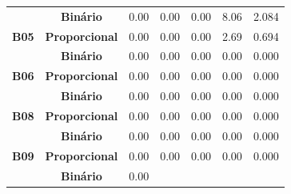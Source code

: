 \begin{table}[htbp]
\begin{tabular}{|c|cccccc|}
		&
		\multicolumn{1}{c|}{\textbf{Binário}} &
		\multicolumn{1}{c|}{0.00} &
		\multicolumn{1}{c|}{0.00} &
		\multicolumn{1}{c|}{0.00} &
		\multicolumn{1}{c|}{8.06} &
		2.084 \\ \cline{2-7} 
		\multirow{-2}{*}{\textbf{B05}} &
		\multicolumn{1}{l|}{\cellcolor[HTML]{F2F2F2}\textbf{Proporcional}} &
		\multicolumn{1}{c|}{\cellcolor[HTML]{F2F2F2}0.00} &
		\multicolumn{1}{c|}{\cellcolor[HTML]{F2F2F2}0.00} &
		\multicolumn{1}{c|}{\cellcolor[HTML]{F2F2F2}0.00} &
		\multicolumn{1}{c|}{\cellcolor[HTML]{F2F2F2}2.69} &
		\cellcolor[HTML]{F2F2F2}0.694 \\ \hline
		&
		\multicolumn{1}{c|}{\textbf{Binário}} &
		\multicolumn{1}{c|}{0.00} &
		\multicolumn{1}{c|}{0.00} &
		\multicolumn{1}{c|}{0.00} &
		\multicolumn{1}{c|}{0.00} &
		0.000 \\ \cline{2-7} 
		\multirow{-2}{*}{\textbf{B06}} &
		\multicolumn{1}{l|}{\cellcolor[HTML]{F2F2F2}\textbf{Proporcional}} &
		\multicolumn{1}{c|}{\cellcolor[HTML]{F2F2F2}0.00} &
		\multicolumn{1}{c|}{\cellcolor[HTML]{F2F2F2}0.00} &
		\multicolumn{1}{c|}{\cellcolor[HTML]{F2F2F2}0.00} &
		\multicolumn{1}{c|}{\cellcolor[HTML]{F2F2F2}0.00} &
		\cellcolor[HTML]{F2F2F2}0.000 \\ \hline
		&
		\multicolumn{1}{c|}{\textbf{Binário}} &
		\multicolumn{1}{c|}{0.00} &
		\multicolumn{1}{c|}{0.00} &
		\multicolumn{1}{c|}{0.00} &
		\multicolumn{1}{c|}{0.00} &
		0.000 \\ \cline{2-7} 
		\multirow{-2}{*}{\textbf{B08}} &
		\multicolumn{1}{l|}{\cellcolor[HTML]{F2F2F2}\textbf{Proporcional}} &
		\multicolumn{1}{c|}{\cellcolor[HTML]{F2F2F2}0.00} &
		\multicolumn{1}{c|}{\cellcolor[HTML]{F2F2F2}0.00} &
		\multicolumn{1}{c|}{\cellcolor[HTML]{F2F2F2}0.00} &
		\multicolumn{1}{c|}{\cellcolor[HTML]{F2F2F2}0.00} &
		\cellcolor[HTML]{F2F2F2}0.000 \\ \hline
		&
		\multicolumn{1}{c|}{\textbf{Binário}} &
		\multicolumn{1}{c|}{0.00} &
		\multicolumn{1}{c|}{0.00} &
		\multicolumn{1}{c|}{0.00} &
		\multicolumn{1}{c|}{0.00} &
		0.000 \\ \cline{2-7} 
		\multirow{-2}{*}{\textbf{B09}} &
		\multicolumn{1}{l|}{\cellcolor[HTML]{F2F2F2}\textbf{Proporcional}} &
		\multicolumn{1}{c|}{\cellcolor[HTML]{F2F2F2}0.00} &
		\multicolumn{1}{c|}{\cellcolor[HTML]{F2F2F2}0.00} &
		\multicolumn{1}{c|}{\cellcolor[HTML]{F2F2F2}0.00} &
		\multicolumn{1}{c|}{\cellcolor[HTML]{F2F2F2}0.00} &
		\cellcolor[HTML]{F2F2F2}0.000 \\ \hline
		&
		\multicolumn{1}{c|}{\textbf{Binário}} &
		\multicolumn{1}{c|}{0.00} &

\end{tabular}
\end{table}
